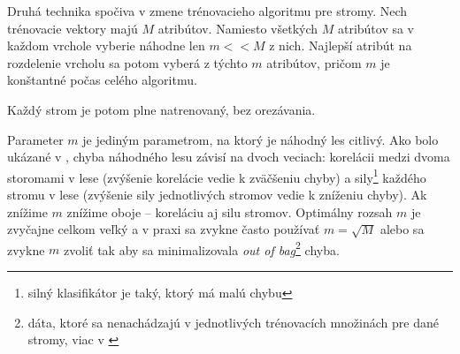 Druhá technika spočiva v zmene trénovacieho algoritmu pre stromy. Nech trénovacie vektory majú $M$ atribútov. Namiesto všetkých $M$ atribútov sa v každom vrchole vyberie náhodne len $m<<M$ z nich. Najlepší atribút na rozdelenie vrcholu sa potom vyberá z týchto $m$ atribútov, pričom $m$ je konštantné počas celého algoritmu.

Každý strom je potom plne natrenovaný, bez orezávania.

Parameter $m$ je jediným parametrom, na ktorý je náhodný les citlivý. Ako bolo ukázané v \cite{randomForestPaper}, chyba náhodného lesu závisí na dvoch veciach: korelácii medzi dvoma storomami v lese (zvýšenie korelácie vedie k zväčšeniu chyby) a sily\footnote{silný klasifikátor je taký, ktorý má malú chybu} každého stromu v lese (zvýšenie sily jednotlivých stromov vedie k zníženiu chyby). Ak znížime $m$ znížime oboje -- koreláciu aj silu stromov. Optimálny rozsah $m$ je zvyčajne celkom veľký a v praxi sa zvykne často používať $m = \sqrt{M}$ alebo sa zvykne $m$ zvoliť tak aby sa minimalizovala \textit{out of bag}\footnote{dáta, ktoré sa nenachádzajú v jednotlivých trénovacích množinách pre dané stromy, viac v \cite{randomForest}} chyba.



